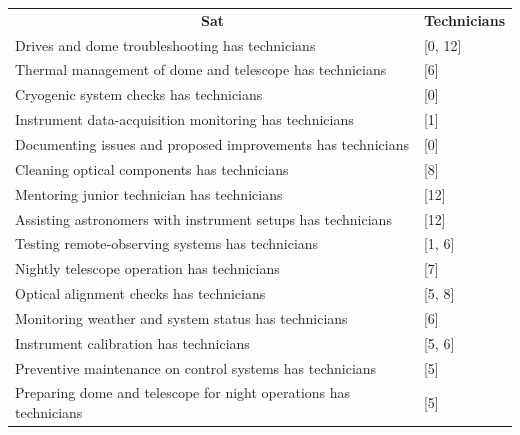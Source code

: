 \documentclass{article}
\begin{document}
\begin{table}[!ht]
\begin{tabular}{ll}
\multicolumn{1}{c}{\textbf{Sat}}                                  & \multicolumn{1}{c}{\textbf{Technicians}} \\
Drives and dome troubleshooting has technicians                   & {[}0, 12{]}                              \\
Thermal management of dome and telescope has technicians          & {[}6{]}                                  \\
Cryogenic system checks has technicians                           & {[}0{]}                                  \\
Instrument data-acquisition monitoring has technicians            & {[}1{]}                                  \\
Documenting issues and proposed improvements has technicians      & {[}0{]}                                  \\
Cleaning optical components has technicians                       & {[}8{]}                                  \\
Mentoring junior technician has technicians                            & {[}12{]}                                 \\
Assisting astronomers with instrument setups has technicians      & {[}12{]}                                 \\
Testing remote‑observing systems has technicians                  & {[}1, 6{]}                               \\
Nightly telescope operation has technicians                       & {[}7{]}                                  \\
Optical alignment checks has technicians                          & {[}5, 8{]}                               \\
Monitoring weather and system status has technicians              & {[}6{]}                                  \\
Instrument calibration has technicians                            & {[}5, 6{]}                               \\
Preventive maintenance on control systems has technicians         & {[}5{]}                                  \\
Preparing dome and telescope for night operations has technicians & {[}5{]}                                  \\                                         
\end{tabular}
\end{table}
\end{document}
